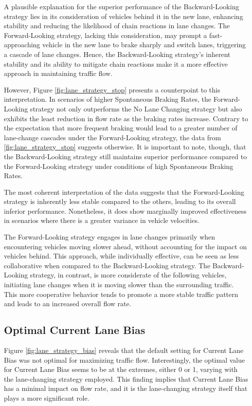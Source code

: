 \documentclass{article}
\begin{document}
A plausible explanation for the superior performance of the Backward-Looking strategy lies in its consideration of vehicles behind it in the new lane, enhancing stability and reducing the likelihood of chain reactions in lane changes. The Forward-Looking strategy, lacking this consideration, may prompt a fast-approaching vehicle in the new lane to brake sharply and switch lanes, triggering a cascade of lane changes. Hence, the Backward-Looking strategy's inherent stability and its ability to mitigate chain reactions make it a more effective approach in maintaining traffic flow.

However, Figure \ref{fig:lane_strategy_stop} presents a counterpoint to this interpretation. In scenarios of higher Spontaneous Braking Rates, the Forward-Looking strategy not only outperforms the No Lane Changing strategy but also exhibits the least reduction in flow rate as the braking rates increase. Contrary to the expectation that more frequent braking would lead to a greater number of lane-change cascades under the Forward-Looking strategy, the data from \ref{fig:lane_strategy_stop} suggests otherwise. It is important to note, though, that the Backward-Looking strategy still maintains superior performance compared to the Forward-Looking strategy under conditions of high Spontaneous Braking Rates.

The most coherent interpretation of the data suggests that the Forward-Looking strategy is inherently less stable compared to the others, leading to its overall inferior performance. Nonetheless, it does show marginally improved effectiveness in scenarios where there is a greater variance in vehicle velocities.

The Forward-Looking strategy engages in lane changes primarily when encountering vehicles moving slower ahead, without accounting for the impact on vehicles behind. This approach, while individually effective, can be seen as less collaborative when compared to the Backward-Looking strategy. The Backward-Looking strategy, in contrast, is more considerate of the following vehicles, initiating lane changes when it is moving slower than the surrounding traffic. This more cooperative behavior tends to promote a more stable traffic pattern and leads to an increased overall flow rate.

\subsection{Optimal Current Lane Bias}
Figure \ref{fig:lane_strategy_bias} reveals that the default setting for Current Lane Bias was not optimal for maximizing traffic flow. Interestingly, the optimal value for Current Lane Bias seems to be at the extremes, either 0 or 1, varying with the lane-changing strategy employed. This finding implies that Current Lane Bias has a minimal impact on flow rate, and it is the lane-changing strategy itself that plays a more significant role.
\end{document}
